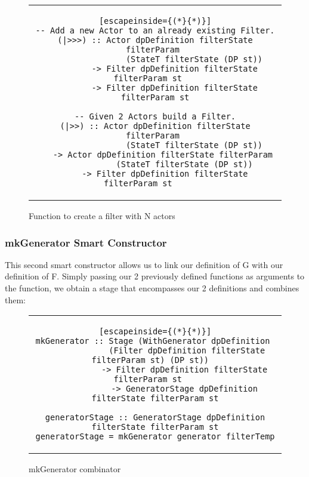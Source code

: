 \begin{figure}[H]
    \begin{tabular}{c}
        \begin{lstlisting}[escapeinside={(*}{*)}]
-- Add a new Actor to an already existing Filter.
(|>>>) :: Actor dpDefinition filterState filterParam 
                (StateT filterState (DP st))
        -> Filter dpDefinition filterState filterParam st	
        -> Filter dpDefinition filterState filterParam st

-- Given 2 Actors build a Filter.
(|>>) :: Actor dpDefinition filterState filterParam 
                (StateT filterState (DP st))
    -> Actor dpDefinition filterState filterParam 
                (StateT filterState (DP st))	
    -> Filter dpDefinition filterState filterParam st       
        \end{lstlisting}
    \end{tabular}
    \caption{Function to create a filter with N actors}
    \label{fig:HC11}
\end{figure}

\subsubsection*{mkGenerator Smart Constructor}
This second smart constructor allows us to link our definition of G with our definition of F.
Simply passing our 2 previously defined functions as arguments to the function, we obtain a stage that encompasses our 2 definitions and combines them:
\begin{figure}[H]
    \begin{tabular}{c}
        \begin{lstlisting}[escapeinside={(*}{*)}]
mkGenerator :: Stage (WithGenerator dpDefinition 
             (Filter dpDefinition filterState filterParam st) (DP st))	
            -> Filter dpDefinition filterState filterParam st	
            -> GeneratorStage dpDefinition filterState filterParam st
            
generatorStage :: GeneratorStage dpDefinition filterState filterParam st
generatorStage = mkGenerator generator filterTemp
        \end{lstlisting}
    \end{tabular}
    \caption{mkGenerator combinator}
    \label{fig:HC12}
\end{figure}

